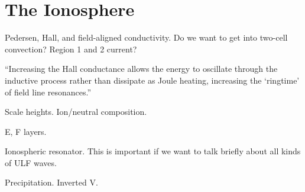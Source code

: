 



\section{The Ionosphere}
  \label{sec_ionos}

Pedersen, Hall, and field-aligned conductivity. Do we want to get into two-cell convection? Region 1 and 2 current? 


``Increasing the Hall conductance allows the energy to oscillate through the inductive process rather than dissipate as Joule heating, increasing the `ringtime' of field line resonances.''\cite{waters_2013}

Scale heights. Ion/neutral composition. 

E, F layers. 

Ionospheric \Alfven resonator. This is important if we want to talk briefly about all kinds of ULF waves. 

Precipitation. Inverted V. 


